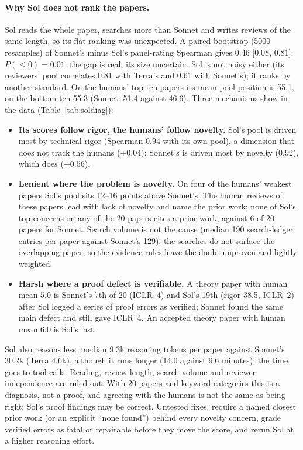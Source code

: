 \documentclass[11pt,a4paper]{article}
\begin{document}
\paragraph{Why Sol does not rank the papers.} Sol reads the whole paper, searches more than
Sonnet and writes reviews of the same length, so its flat ranking was unexpected. A paired
bootstrap (5000 resamples) of Sonnet's minus Sol's panel-rating Spearman gives $0.46$ [$0.08$,
$0.81$], $P(\le 0)=0.01$: the gap is real, its size uncertain. Sol is not noisy either (its
reviewers' pool correlates 0.81 with Terra's and 0.61 with Sonnet's); it ranks by another
standard. On the humans' top ten papers its mean pool position is 55.1, on the bottom ten 55.3
(Sonnet: 51.4 against 46.6). Three mechanisms show in the data (Table~\ref{tab:soldiag}):
\begin{itemize}
\item \textbf{Its scores follow rigor, the humans' follow novelty.} Sol's pool is driven most by
technical rigor (Spearman 0.94 with its own pool), a dimension that does not track the humans
($+0.04$); Sonnet's is driven most by novelty (0.92), which does ($+0.56$).
\item \textbf{Lenient where the problem is novelty.} On four of the humans' weakest papers Sol's
pool sits 12--16 points above Sonnet's. The human reviews of these papers lead with lack of
novelty and name the prior work; none of Sol's top concerns on any of the 20 papers cites a prior
work, against 6 of 20 papers for Sonnet. Search volume is not the cause (median 190 search-ledger
entries per paper against Sonnet's 129): the searches do not surface the overlapping paper, so the
evidence rules leave the doubt unproven and lightly weighted.
\item \textbf{Harsh where a proof defect is verifiable.} A theory paper with human mean 5.0 is
Sonnet's 7th of 20 (ICLR~4) and Sol's 19th (rigor 38.5, ICLR~2) after Sol logged a series of
proof errors as verified; Sonnet found the same main defect and still gave ICLR~4. An accepted
theory paper with human mean 6.0 is Sol's last.
\end{itemize}
Sol also reasons less: median 9.3k reasoning tokens per paper against Sonnet's 30.2k (Terra
4.6k), although it runs longer (14.0 against 9.6 minutes); the time goes to tool calls. Reading,
review length, search volume and reviewer independence are ruled out. With 20 papers and keyword
categories this is a diagnosis, not a proof, and agreeing with the humans is not the same as being
right: Sol's proof findings may be correct. Untested fixes: require a named closest prior work
(or an explicit ``none found'') behind every novelty concern, grade verified errors as fatal or
repairable before they move the score, and rerun Sol at a higher reasoning effort.
\end{document}
